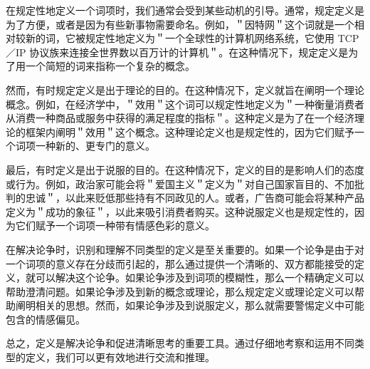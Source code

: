 在规定性地定义一个词项时，我们通常会受到某些动机的引导。通常，规定定义是为了方便，或者是因为有些新事物需要命名。例如，＂因特网＂这个词就是一个相对较新的词，它被规定性地定义为＂一个全球性的计算机网络系统，它使用 TCP／IP 协议族来连接全世界数以百万计的计算机＂。在这种情况下，规定定义是为了用一个简短的词来指称一个复杂的概念。

然而，有时规定定义是出于理论的目的。在这种情况下，定义就旨在阐明一个理论概念。例如，在经济学中，＂效用＂这个词可以规定性地定义为＂一种衡量消费者从消费一种商品或服务中获得的满足程度的指标＂。这种定义是为了在一个经济理论的框架内阐明＂效用＂这个概念。这种理论定义也是规定性的，因为它们赋予一个词项一种新的、更专门的意义。

最后，有时定义是出于说服的目的。在这种情况下，定义的目的是影响人们的态度或行为。例如，政治家可能会将＂爱国主义＂定义为＂对自己国家盲目的、不加批判的忠诚＂，以此来贬低那些持有不同政见的人。或者，广告商可能会将某种产品定义为＂成功的象征＂，以此来吸引消费者购买。这种说服定义也是规定性的，因为它们赋予一个词项一种带有情感色彩的意义。

在解决论争时，识别和理解不同类型的定义是至关重要的。如果一个论争是由于对一个词项的意义存在分歧而引起的，那么通过提供一个清晰的、双方都能接受的定义，就可以解决这个论争。如果论争涉及到词项的模糊性，那么一个精确定义可以帮助澄清问题。如果论争涉及到新的概念或理论，那么规定定义或理论定义可以帮助阐明相关的思想。然而，如果论争涉及到说服定义，那么就需要警惕定义中可能包含的情感偏见。

总之，定义是解决论争和促进清晰思考的重要工具。通过仔细地考察和运用不同类型的定义，我们可以更有效地进行交流和推理。 